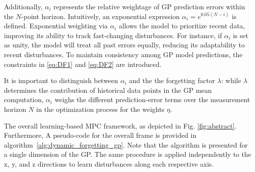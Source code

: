 


Additionally, $\alpha_i$ represents the relative weightage of \ac{GP} prediction errors within the $N$-point horizon. Intuitively, an exponential expression $\alpha_i = e^{0.05 (N - i)}$ is defined. Exponential weighting via $\alpha_i$ allows the model to prioritize recent data, improving its ability to track fast-changing disturbances. For instance, if $\alpha_i$ is set as unity, the model will treat all past errors equally, reducing its adaptability to recent disturbances. To maintain consistency among \ac{GP} model predictions, the constraints in \eqref{eq:DF1} and \eqref{eq:DF2} are introduced.




\begin{remark}
It is important to distinguish between $\alpha_i$ and the the forgetting factor $\lambda$: while $\lambda$ determines the contribution of historical data points in the \ac{GP} mean computation, \(\alpha_i\) weighs the different prediction-error terms over the measurement horizon \(N\) in the optimization process for the weights \(\eta\). 
\end{remark}




The overall learning-based MPC framework, as depicted in Fig. \ref{fig:abstract}. Furthermore, A pseudo-code for the overall frame is provided in algorithm~\ref{alg:dynamic_forgetting_gp}. Note that the algorithm is presented for a single dimension of the \ac{GP}. The same procedure is applied independently to the x, y, and z directions to learn disturbances along each respective axis.



